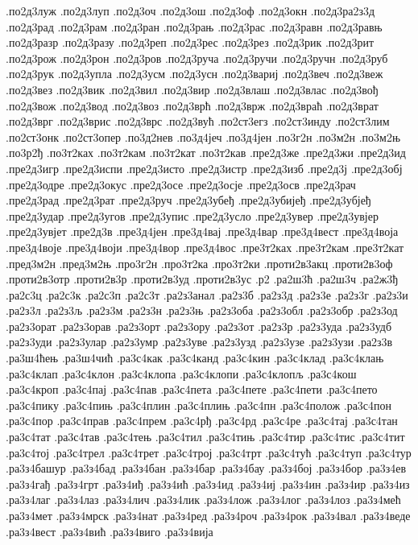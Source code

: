 {.по2д3луж
.по2д3луп
.по2д3оч
.по2д3ош
.по2д3оф
.по2д3окн
.по2д3ра2з3д
.по2д3рад
.по2д3рам
.по2д3ран
.по2д3рањ
.по2д3рас
.по2д3равн
.по2д3равњ
.по2д3разр
.по2д3разу
.по2д3реп
.по2д3рес
.по2д3рез
.по2д3рик
.по2д3рит
.по2д3рож
.по2д3рон
.по2д3ров
.по2д3руча
.по2д3ручи
.по2д3ручн
.по2д3руб
.по2д3рук
.по2д3упла
.по2д3усм
.по2д3усн
.по2д3вариј
.по2д3веч
.по2д3веж
.по2д3вез
.по2д3вик
.по2д3вил
.по2д3вир
.по2д3влаш
.по2д3влас
.по2д3вођ
.по2д3вож
.по2д3вод
.по2д3воз
.по2д3врћ
.по2д3врж
.по2д3враћ
.по2д3врат
.по2д3врг
.по2д3врис
.по2д3врс
.по2д3вућ
.по2ст3егз
.по2ст3инду
.по2ст3лим
.по2ст3онк
.по2ст3опер
.по3д2нев
.по3д4јеч
.по3д4јен
.по3г2н
.по3м2н
.по3м2њ
.по3р2ђ
.по3т2ках
.по3т2кам
.по3т2кат
.по3т2кав
.пре2д3же
.пре2д3жи
.пре2д3ид
.пре2д3игр
.пре2д3испи
.пре2д3исто
.пре2д3истр
.пре2д3изб
.пре2д3ј
.пре2д3обј
.пре2д3одре
.пре2д3окус
.пре2д3осе
.пре2д3осје
.пре2д3осв
.пре2д3рач
.пре2д3рад
.пре2д3рат
.пре2д3руч
.пре2д3убеђ
.пре2д3убијеђ
.пре2д3убјеђ
.пре2д3удар
.пре2д3угов
.пре2д3упис
.пре2д3усло
.пре2д3увер
.пре2д3увјер
.пре2д3увјет
.пре2д3в
.пре3д4јен
.пре3д4вај
.пре3д4вар
.пре3д4вест
.пре3д4воја
.пре3д4воје
.пре3д4воји
.пре3д4вор
.пре3д4вос
.пре3т2ках
.пре3т2кам
.пре3т2кат
.пред3м2н
.пред3м2њ
.про3г2н
.про3т2ка
.про3т2ки
.проти2в3акц
.проти2в3оф
.проти2в3отр
.проти2в3р
.проти2в3уд
.проти2в3ус
.р2
.ра2ш3ћ
.ра2ш3ч
.ра2ж3ђ
.ра2с3ц
.ра2с3к
.ра2с3п
.ра2с3т
.ра2з3анал
.ра2з3б
.ра2з3д
.ра2з3е
.ра2з3г
.ра2з3и
.ра2з3л
.ра2з3љ
.ра2з3м
.ра2з3н
.ра2з3њ
.ра2з3оба
.ра2з3обл
.ра2з3обр
.ра2з3од
.ра2з3орат
.ра2з3орав
.ра2з3орт
.ра2з3ору
.ра2з3от
.ра2з3р
.ра2з3уда
.ра2з3удб
.ра2з3уди
.ра2з3улар
.ра2з3умр
.ра2з3уве
.ра2з3узд
.ра2з3узе
.ра2з3узи
.ра2з3в
.ра3ш4ћењ
.ра3ш4чић
.ра3с4как
.ра3с4канд
.ра3с4кин
.ра3с4клад
.ра3с4клањ
.ра3с4клап
.ра3с4клон
.ра3с4клопа
.ра3с4клопи
.ра3с4клопљ
.ра3с4кош
.ра3с4кроп
.ра3с4пај
.ра3с4пав
.ра3с4пета
.ра3с4пете
.ра3с4пети
.ра3с4пето
.ра3с4пику
.ра3с4пињ
.ра3с4плин
.ра3с4плињ
.ра3с4пн
.ра3с4полож
.ра3с4пон
.ра3с4пор
.ра3с4прав
.ра3с4прем
.ра3с4рђ
.ра3с4рд
.ра3с4ре
.ра3с4тај
.ра3с4тан
.ра3с4тат
.ра3с4тав
.ра3с4тењ
.ра3с4тил
.ра3с4тињ
.ра3с4тир
.ра3с4тис
.ра3с4тит
.ра3с4тој
.ра3с4трел
.ра3с4трет
.ра3с4трој
.ра3с4трт
.ра3с4тућ
.ра3с4туп
.ра3с4тур
.ра3з4башур
.ра3з4бад
.ра3з4бан
.ра3з4бар
.ра3з4бау
.ра3з4бој
.ра3з4бор
.ра3з4ев
.ра3з4гађ
.ра3з4грт
.ра3з4иђ
.ра3з4ић
.ра3з4ид
.ра3з4иј
.ра3з4ин
.ра3з4ир
.ра3з4из
.ра3з4лаг
.ра3з4лаз
.ра3з4лич
.ра3з4лик
.ра3з4лож
.ра3з4лог
.ра3з4лоз
.ра3з4мећ
.ра3з4мет
.ра3з4мрск
.ра3з4нат
.ра3з4ред
.ра3з4роч
.ра3з4рок
.ра3з4вал
.ра3з4веде
.ра3з4вест
.ра3з4вић
.ра3з4виго
.ра3з4вија
}
